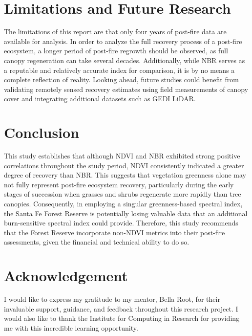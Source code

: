 \documentclass[11pt]{article}
\begin{document}
\section{Limitations and Future Research}

The limitations of this report are that only four years of post-fire data are available for analysis. In order to analyze the full recovery process of a post-fire ecosystem, a longer period of post-fire regrowth should be observed, as full canopy regeneration can take several decades. Additionally, while NBR serves as a reputable and relatively accurate index for comparison, it is by no means a complete reflection of reality. Looking ahead, future studies could benefit from validating remotely sensed recovery estimates using field measurements of canopy cover and integrating additional datasets such as GEDI LiDAR.

\section{Conclusion}

This study establishes that although NDVI and NBR exhibited strong positive correlations throughout the study period, NDVI consistently indicated a greater degree of recovery than NBR. This suggests that vegetation greenness alone may not fully represent post-fire ecosystem recovery, particularly during the early stages of succession when grasses and shrubs regenerate more rapidly than tree canopies. Consequently, in employing a singular greenness-based spectral index, the Santa Fe Forest Reserve is potentially losing valuable data that an additional burn-sensitive spectral index could provide. Therefore, this study recommends that the Forest Reserve incorporate non-NDVI metrics into their post-fire assessments, given the financial and technical ability to do so.

\section*{Acknowledgement}

I would like to express my gratitude to my mentor, Bella Root, for their invaluable support, guidance, and feedback throughout this research project. I would also like to thank the Institute for Computing in Research for providing me with this incredible learning opportunity.
\end{document}
